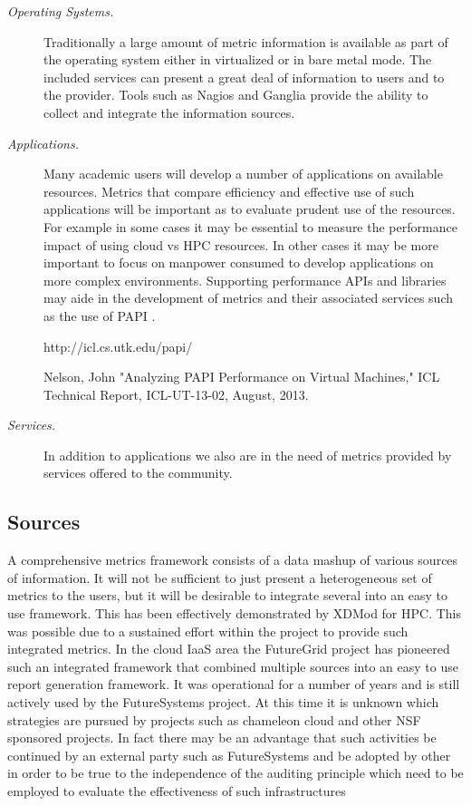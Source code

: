 \documentclass{sig-alternate-05-2015}
\begin{document}
\begin{description}
\item[\it Operating Systems.] Traditionally a large amount of metric
  information is available as part of the operating system either in
  virtualized or in bare metal mode. The included services can present a
  great deal of information to users and to the provider. Tools such
  as Nagios and Ganglia provide  the ability to collect and integrate
  the information sources.

\item[\it Applications.] Many academic users will develop a number of
  applications on available resources. Metrics that compare efficiency
  and effective use of such applications will be important as to
  evaluate prudent use of the resources. For example in some cases it
  may be essential to measure the performance impact of using cloud vs
  HPC resources. In other cases it may be more important to focus on
  manpower consumed to develop applications on more complex
  environments. Supporting performance APIs and libraries may aide in
  the development of metrics and their associated services such as the
  use of PAPI \cite{papi2014}.

http://icl.cs.utk.edu/papi/


Nelson, John "Analyzing PAPI Performance on Virtual Machines," ICL
Technical Report, ICL-UT-13-02, August, 2013.

\item[\it Services.] In addition to applications we also are in the
  need of metrics provided by services offered to the community. 

\end{description}


\cite{LeeFGresource}
\subsection{Sources}

A comprehensive metrics framework consists of a data mashup of various
sources of information. It will not be sufficient to just present a
heterogeneous set of metrics to the users, but it will be desirable to
integrate several into an easy to use framework. This has been
effectively demonstrated by XDMod for HPC. This was possible due to a
sustained effort within the project to provide such integrated
metrics. In the cloud IaaS area the FutureGrid project has pioneered
such an integrated framework that combined multiple sources into an
easy to use report generation framework. It was operational for a
number of years and is still actively used by the FutureSystems
project. At this time it is unknown which strategies are pursued by
projects such as chameleon cloud and other NSF sponsored projects. 
In fact there may be an advantage that such activities be continued by
an external party such as FutureSystems and be adopted by other in
order to be true to the independence of the auditing principle which
need to be employed to evaluate the effectiveness of such
infrastructures 
\end{document}
